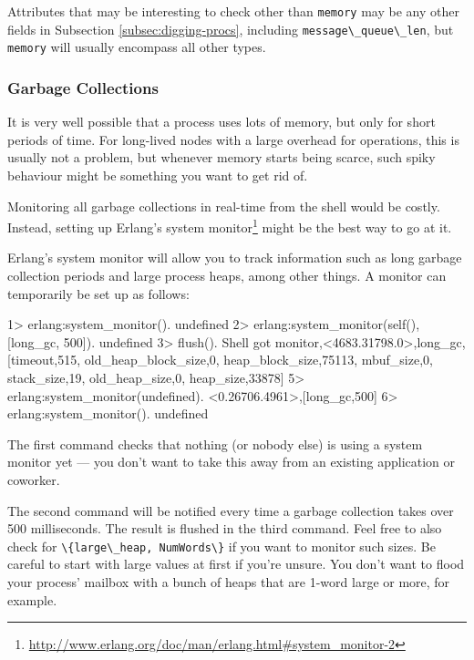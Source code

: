 \documentclass[11pt, oneside]{book}   	%
\newcommand{\expression}[1]{\Verb`#1`}
\newcommand{\term}[1]{\Verb`#1`}
\begin{document}
Attributes that may be interesting to check other than \term{memory} may be any other fields in Subsection \ref{subsec:digging-procs}, including \term{message\_queue\_len}, but \term{memory} will usually encompass all other types.

\subsubsection{Garbage Collections}
\label{subsubsec:leak-gc}

It is very well possible that a process uses lots of memory, but only for short periods of time. For long-lived nodes with a large overhead for operations, this is usually not a problem, but whenever memory starts being scarce, such spiky behaviour might be something you want to get rid of.

Monitoring all garbage collections in real-time from the shell would be costly. Instead, setting up Erlang's system monitor\footnote{\href{http://www.erlang.org/doc/man/erlang.html\#system\_monitor-2}{http://www.erlang.org/doc/man/erlang.html\#system\_monitor-2}} might be the best way to go at it.

Erlang's system monitor will allow you to track information such as long garbage collection periods and large process heaps, among other things. A monitor can temporarily be set up as follows:

\begin{VerbatimEshell}
1> erlang:system_monitor().
undefined
2> erlang:system_monitor(self(), [{long_gc, 500}]).
undefined
3> flush().
Shell got {monitor,<4683.31798.0>,long_gc,
                   [{timeout,515},
                    {old_heap_block_size,0},
                    {heap_block_size,75113},
                    {mbuf_size,0},
                    {stack_size,19},
                    {old_heap_size,0},
                    {heap_size,33878}]}
5> erlang:system_monitor(undefined).
{<0.26706.4961>,[{long_gc,500}]}
6> erlang:system_monitor().
undefined
\end{VerbatimEshell}

The first command checks that nothing (or nobody else) is using a system monitor yet — you don't want to take this away from an existing application or coworker.

The second command will be notified every time a garbage collection takes over 500 milliseconds. The result is flushed in the third command. Feel free to also check for \expression{\{large\_heap, NumWords\}} if you want to monitor such sizes.
Be careful to start with large values at first if you're unsure. You don't want to flood your process' mailbox with a bunch of heaps that are 1-word large or more, for example.
\end{document}
